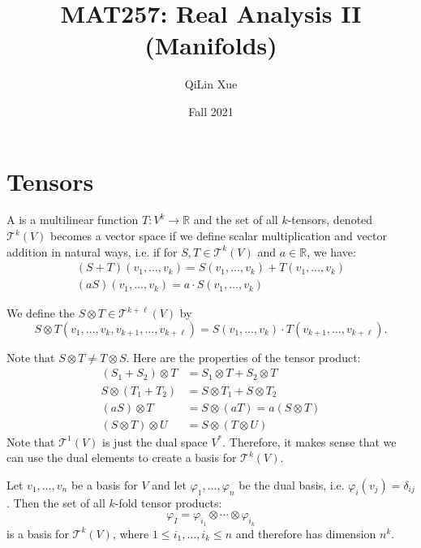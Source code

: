 \documentclass{article}
\title{MAT257: Real Analysis II (Manifolds)}
\author{QiLin Xue}
\date{Fall 2021}
\numberwithin{equation}{section}
\begin{document}
\maketitle
\newpage
\section{Tensors}
\begin{definition}
    A  is a multilinear function $T:V^k \rightarrow \mathbb{R}$ and the set of all $k$-tensors, denoted $\mathcal{T}^k(V)$ becomes a vector space if we define scalar multiplication and vector addition in natural ways, i.e. if for $S,T\in \mathcal{T}^k(V)$ and $a\in\mathbb{R}$, we have:
    \begin{align}
        (S+T)(v_1,\dots,v_k) = S(v_1,\dots,v_k) + T(v_1,\dots,v_k) \\ 
        (aS)(v_1,\dots,v_k) = a \cdot S(v_1,\dots,v_k)
    \end{align}
\end{definition}
\begin{definition}
    We define the  $S\otimes T \in \mathcal{T}^{k+\ell}(V)$ by
    \begin{equation}
        S \otimes T(v_1,\dots,v_k,v_{k+1},\dots,v_{k+\ell}) = S(v_1,\dots,v_k) \cdot T(v_{k+1},\dots,v_{k+\ell}).
    \end{equation}
\end{definition}
Note that $S\otimes T \neq T\otimes S.$ Here are the properties of the tensor product:
\begin{align*}
    (S_1+S_2)\otimes T &= S_1\otimes T + S_2\otimes T \\
    S \otimes (T_1 + T_2) &= S \otimes T_1 + S \otimes T_2 \\
    (aS) \otimes T &= S \otimes (aT) = a(S\otimes T) \\ 
    (S\otimes T) \otimes U &= S \otimes (T \otimes U)
\end{align*}
Note that $\mathcal{T}^1(V)$ is just the dual space $V^*.$ Therefore, it makes sense that we can use the dual elements to create a basis for $\mathcal{T}^k(V).$
\begin{theorem}
    Let $v_1,\dots,v_n$ be a basis for $V$ and let $\varphi_1,\dots,\varphi_n$ be the dual basis, i.e. $\varphi_i(v_j) = \delta_{ij}$. Then the set of all $k$-fold tensor products:
    \begin{equation}
        \varphi_I = \varphi_{i_1} \otimes \cdots \otimes \varphi_{i_k}
    \end{equation}
    is a basis for $\mathcal{T}^k(V)$, where $1\le i_1,\dots,i_k \le n$ and therefore has dimension $n^k$. 
\end{theorem}
\end{document}
